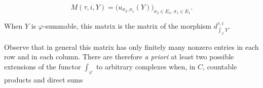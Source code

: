 \begin{equation}
  M(\tau,i,Y)
  =\bigl(u_{\sigma_2,\sigma_1}(Y)\bigr)_
    {\sigma_2\in E_2,\,\sigma_1\in E_1}.
  \tag{2.2.3.2}
\end{equation}

When $Y$ is $\varphi$-summable, this matrix is the matrix of the morphism
$d_{\int_\varphi Y}^{\tau,i}$.

Observe that in general this matrix has only finitely many nonzero entries
in each row and in each column. There are therefore \emph{a priori} at
least two possible extensions of the functor $\int_\varphi$ to arbitrary
complexes when, in $C$, countable products and direct sums
